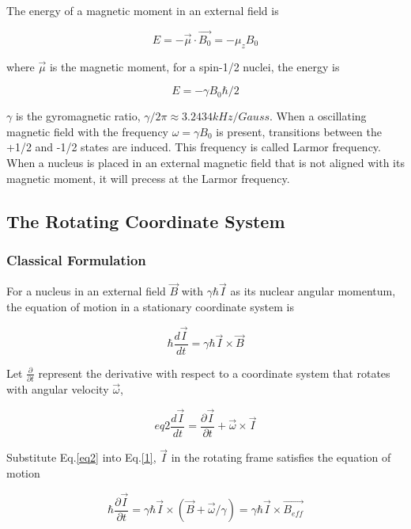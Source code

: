 The energy of a magnetic moment in an external field is

\begin{equation}
E = -\vec{\mu}\cdot \vec{B_{0}} = -\mu_{z}B_{0}
\end{equation}

where $\vec{\mu}$ is the magnetic moment, for a spin-1/2 nuclei, the energy is

\begin{equation}
E = -\gamma B_{0}\hbar/2
\end{equation}

$\gamma$ is the gyromagnetic ratio, $\gamma /2\pi \approx 3.2434kHz/Gauss$. When a oscillating magnetic field with the frequency $\omega=\gamma B_{0}$ is present, transitions between the +1/2 and -1/2 states are induced. This frequency is called Larmor frequency. When a nucleus is placed in an external magnetic field that is not aligned with its magnetic moment, it will precess at the Larmor frequency.

\subsection{The Rotating Coordinate System}

\subsubsection{Classical Formulation}

For a nucleus in an external field $\vec{B}$ with $\gamma \hbar \vec{I}$ as its nuclear angular momentum, the equation of motion in a stationary coordinate system is

\begin{equation}\label{eq1}
\hbar \frac{d\vec{I}}{dt}=\gamma \hbar \vec{I} \times \vec{B}
\end{equation}

Let $\frac{\partial}{\partial t}$ represent the derivative with respect to a coordinate system that rotates with angular velocity $\vec{\omega}$,

\begin{equation}{eq2}
\frac{d\vec{I}}{dt}=\frac{\partial \vec{I}}{\partial t}+\vec{\omega} \times \vec{I}
\end{equation}

Substitute Eq.\ref{eq2} into Eq.\ref{1}, $\vec{I}$ in the rotating frame satisfies the equation of motion 

\begin{equation}
\hbar \frac{\partial \vec{I}}{\partial t}=\gamma \hbar \vec{I} \times (\vec{B} + \vec{\omega}/\gamma)=\gamma \hbar \vec{I} \times \vec{B_{eff}}
\end{equation}

